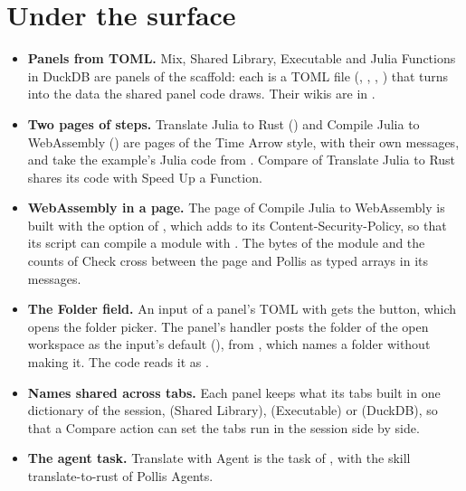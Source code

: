 \section{Under the surface}\label{sec:machinery}
\begin{itemize}
  \item \textbf{Panels from TOML.} Mix, Shared Library, Executable and Julia Functions in DuckDB are panels of the
    scaffold: each is a TOML file (, , , )
    that  turns into the data the shared panel code draws. Their wikis are in
    .
  \item \textbf{Two pages of steps.} Translate Julia to Rust () and Compile Julia to
    WebAssembly () are pages of the Time Arrow style, with their own messages, and take the
    example's Julia code from . Compare of Translate Julia to Rust shares its code with Speed Up
    a Function.
  \item \textbf{WebAssembly in a page.} The page of Compile Julia to WebAssembly is built with the option
     of , which adds  to its
    Content-Security-Policy, so that its script can compile a module with . The bytes of
    the module and the counts of Check cross between the page and Pollis as typed arrays in its messages.
  \item \textbf{The Folder field.} An input of a panel's TOML with  gets the
     button, which opens the folder picker. The panel's handler posts the folder of the open workspace as
    the input's default (), from , which names a folder without
    making it. The code reads it as .
  \item \textbf{Names shared across tabs.} Each panel keeps what its tabs built in one dictionary of the session,
     (Shared Library),  (Executable) or  (DuckDB), so that a Compare action can
    set the tabs run in the session side by side.
  \item \textbf{The agent task.} Translate with Agent is the task  of , with
    the skill translate-to-rust of Pollis Agents.
\end{itemize}

